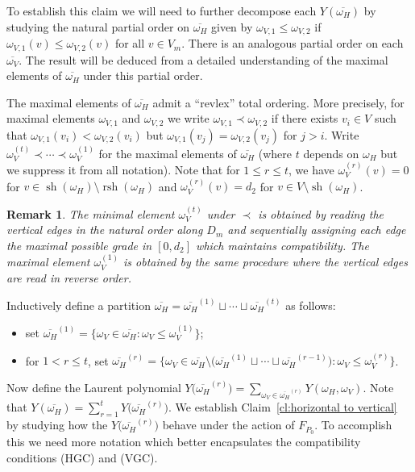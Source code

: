 \documentclass{amsart}
\newtheorem{remark}[theorem]{Remark}
\newcommand{\rsh}{\operatorname{rsh}}
\newcommand{\sh}{\operatorname{sh}}
\begin{document}
To establish this claim we will need to further decompose each $Y(\overline{\omega_H})$ by studying the natural partial order on $\overline{\omega_H}$ given by $\omega_{V,1}\le\omega_{V,2}$ if $\omega_{V,1}(v)\le\omega_{V,2}(v)$ for all $v\in V_m$.  There is an analogous partial order on each $\overline{\omega_V}$.  The result will be deduced from a detailed understanding of the maximal elements of $\overline{\omega_H}$ under this partial order.  

The maximal elements of $\overline{\omega_H}$ admit a ``revlex'' total ordering.  More precisely, for maximal elements $\omega_{V,1}$ and $\omega_{V,2}$ we write $\omega_{V,1}\prec\omega_{V,2}$ if there exists $v_i\in V$ such that $\omega_{V,1}(v_i)<\omega_{V,2}(v_i)$ but $\omega_{V,1}(v_j)=\omega_{V,2}(v_j)$ for $j>i$.  Write $\omega_V^{(t)}\prec\cdots\prec\omega_V^{(1)}$ for the maximal elements of $\overline{\omega_H}$ (where $t$ depends on $\omega_H$ but we suppress it from all notation).  Note that for $1\le r\le t$, we have $\omega_V^{(r)}(v)=0$ for $v\in\sh(\omega_H)\setminus\rsh(\omega_H)$ and $\omega_V^{(r)}(v)=d_2$ for $v\in V\setminus\sh(\omega_H)$.
\begin{remark}
  The minimal element $\omega_V^{(t)}$ under $\prec$ is obtained by reading the vertical edges in the natural order along $D_m$ and sequentially assigning each edge the maximal possible grade in $[0,d_2]$ which maintains compatibility.  The maximal element $\omega_V^{(1)}$ is obtained by the same procedure where the vertical edges are read in reverse order.
\end{remark}

Inductively define a partition $\overline{\omega_H}=\overline{\omega_H}^{(1)}\sqcup\cdots\sqcup\overline{\omega_H}^{(t)}$ as follows:
\begin{itemize}
 \item set $\overline{\omega_H}^{(1)}=\big\{\omega_V\in\overline{\omega_H}:\omega_V\le\omega_V^{(1)}\big\}$;
 \item for $1<r\le t$, set $\overline{\omega_H}^{(r)}=\Big\{\omega_V\in\overline{\omega_H}\setminus\big(\overline{\omega_H}^{(1)}\sqcup\cdots\sqcup\overline{\omega_H}^{(r-1)}\big):\omega_V\le\omega_V^{(r)}\Big\}$.
\end{itemize}
Now define the Laurent polynomial $Y\big(\overline{\omega_H}^{(r)}\big)=\sum\limits_{\omega_V\in\overline{\omega_H}^{(r)}} Y(\omega_H,\omega_V)$.  Note that $Y(\overline{\omega_H})=\sum\limits_{r=1}^t  Y\big(\overline{\omega_H}^{(r)}\big)$.  We establish Claim~\ref{cl:horizontal to vertical} by studying how the $Y\big(\overline{\omega_H}^{(r)}\big)$ behave under the action of $F_{P_0}$.  To accomplish this we need more notation which better encapsulates the compatibility conditions (HGC) and (VGC).
\end{document}
